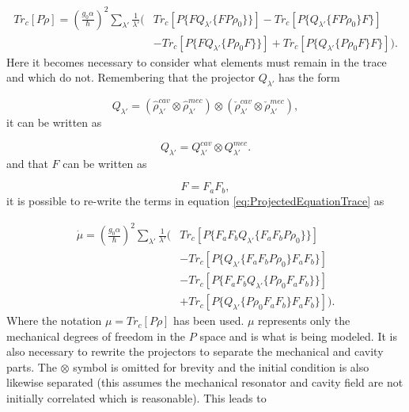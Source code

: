 \documentclass[12pt]{article}
\begin{document}
\begin{align}\label{eq:ProjectedEquationTrace}
   Tr_c[P\dot{\rho}] = (\frac{g_0 \alpha}{\hbar})^2 \sum_{\lambda'}\frac{1}{\lambda'}\Bigg(& Tr_c[P\{FQ_{\lambda'}\{FP\rho_0\}\}]-Tr_c[P\{Q_{\lambda'}\{FP\rho_0\}F\}]\nonumber\\
    &-Tr_c[P\{FQ_{\lambda'}\{P\rho_0F \} \}] +Tr_c[P\{Q_{\lambda'}\{P\rho_0F \}F\}] \Bigg).
\end{align} Here it becomes necessary to consider what elements must remain in the trace and which do not. Remembering that the projector $Q_{\lambda'}$ has the form

\begin{equation}
    Q_{\lambda'} =  (\hat{\rho}_{\lambda'}^{cav}\otimes \hat{\rho}_{\lambda'}^{mec})\otimes(\check{\rho}_{\lambda'}^{cav}\otimes\check{\rho}_{\lambda'}^{mec}),
\end{equation} it can be written as

\begin{equation}
    Q_{\lambda'} = Q_{\lambda'}^{cav}\otimes Q_{\lambda'}^{mec}.
\end{equation} and that $F$ can be written as

\begin{equation}
    F = F_a F_b,
\end{equation} it is possible to re-write the terms in equation \eqref{eq:ProjectedEquationTrace} as

\begin{align*}
    \dot{\mu} = (\frac{g_0 \alpha}{\hbar})^2 \sum_{\lambda'}\frac{1}{\lambda'}\Bigg(& Tr_c[P\{F_a F_bQ_{\lambda'}\{F_a F_bP\rho_0\}\}]\\
    &-Tr_c[P\{Q_{\lambda'}\{F_a F_bP\rho_0\}F_a F_b\}]\\
    &-Tr_c[P\{F_a F_bQ_{\lambda'}\{P\rho_0F_a F_b \} \}]\\ &+Tr_c[P\{Q_{\lambda'}\{P\rho_0 F_a F_b\}F_a F_b\}] \Bigg).
\end{align*} Where the notation $\mu=Tr_c[P\rho]$ has been used. $\mu$ represents only the mechanical degrees of freedom in the $P$ space and is what is being modeled. It is also necessary to rewrite the projectors to separate the mechanical and cavity parts. The $\otimes$ symbol is omitted for brevity and the initial condition is also likewise separated (this assumes the mechanical resonator and cavity field are not initially correlated which is reasonable). This leads to
\end{document}
